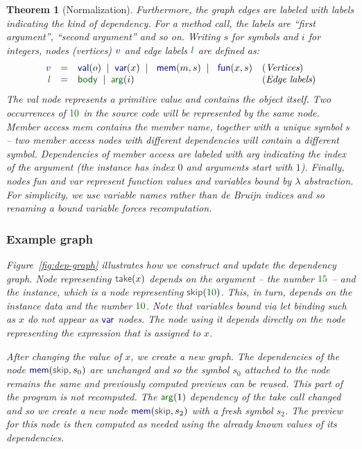 \documentclass[acmsmall,anonymous,fleqn]{acmart}\settopmatter{printfolios=false,printccs=false,printacmref=false}
\newcounter{thc}
\theoremstyle{plain}
\newtheorem{theorem}[thc]{Theorem}
\theoremstyle{definition}
\newcommand{\lsep}{\;\;|\;\;}
\newcommand{\num}[1]{\textcolor{numclr}{#1}}
\newcommand{\ident}[1]{\textnormal{\textcolor{idclr}{\sffamily #1}}}
\newcommand{\kvd}[1]{\textnormal{\textcolor{kvdclr}{\sffamily #1}}}
\newcommand{\bndclr}[1]{\textcolor{kvdclr}{#1}}
\newcommand{\blblclr}[1]{\textcolor{numclr}{#1}}
\newcommand{\bnd}[1]{\textnormal{\textcolor{kvdclr}{\sffamily #1}}}
\newcommand{\blbl}[1]{\textnormal{\textcolor{numclr}{\sffamily #1}}}
\begin{document}
\begin{theorem}[Normalization]
Furthermore, the graph edges are labeled with labels indicating the kind of dependency. For
a method call, the labels are ``first argument'', ``second argument'' and so on. Writing
$s$ for symbols and $i$ for integers, nodes (vertices) $\bndclr{v}$ and edge labels $\blblclr{l}$
are defined as:
%
\begin{equation*}
\begin{array}{rcll}
\bndclr{v}&=&\bnd{val}(o) \lsep \bnd{var}(x)\lsep \bnd{mem}(m, s)\lsep \bnd{fun}(x, s)&(\textit{Vertices})\\
\blblclr{l}&=&\blbl{body} \lsep \blbl{arg}(i)&(\textit{Edge labels})\\
\end{array}
\end{equation*}
%
The \bnd{val} node represents a primitive value and contains the object itself. Two occurrences
of $\num{10}$ in the source code will be represented by the same node. Member access \bnd{mem}
contains the member name, together with a unique symbol $s$ -- two member access nodes with
different dependencies will contain a different symbol. Dependencies of member access are labeled
with \blbl{arg} indicating the index of the argument (the instance has index $0$ and arguments
start with $1$). Finally, nodes \bnd{fun} and \bnd{var} represent function values and variables
bound by $\lambda$ abstraction. For simplicity, we use variable names rather than de Bruijn
indices and so renaming a bound variable forces recomputation.


\subsubsection{Example graph}
Figure~\ref{fig:dep-graph} illustrates how we construct and update the
dependency graph. Node representing $\ident{take}(x)$ depends on the argument -- the
number $\num{15}$ -- and the instance, which is a node representing $\ident{skip}(\num{10})$.
This, in turn, depends on the instance \ident{data} and the number $\num{10}$. Note that variables
bound via \kvd{let} binding such as $x$ do not appear as $\bnd{var}$ nodes. The node using it
depends directly on the node representing the expression that is assigned to $x$.

After changing the value of $x$, we create a new graph. The dependencies of the node
$\bnd{mem}(\ident{skip}, s_0)$ are unchanged and so the symbol $s_0$ attached to the node remains
the same and previously computed previews can be reused. This part of the program is not recomputed.
The $\blbl{arg}(1)$ dependency of the \ident{take} call
changed and so we create a new node $\bnd{mem}(\ident{skip}, s_2)$ with a fresh symbol $s_2$.
The preview for this node is then computed as needed using the already known values of its
dependencies.


\end{theorem}
\end{document}
